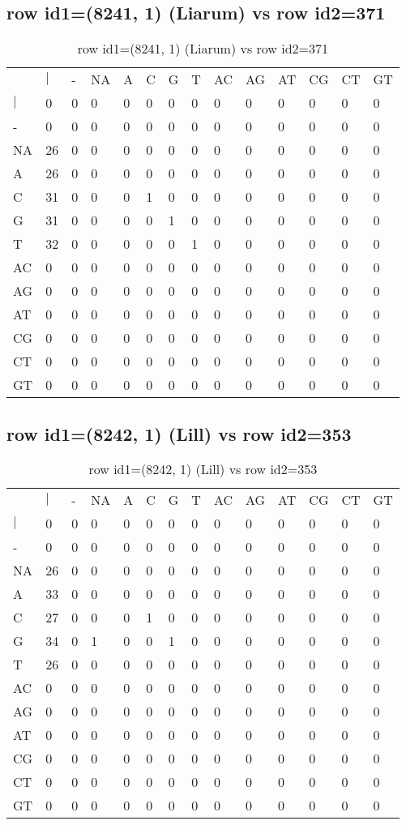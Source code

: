 \subsection{row id1=(8241, 1) (Liarum) vs row id2=371}
\begin{center}
\begin{longtable}{|l|l|l|l|l|l|l|l|l|l|l|l|l|l|}
\caption{row id1=(8241, 1) (Liarum) vs row id2=371} \label{table_dm178}\\
\hline
\\
\hline
&$|$&-&NA&A&C&G&T&AC&AG&AT&CG&CT&GT\\
$|$&0&0&0&0&0&0&0&0&0&0&0&0&0\\
-&0&0&0&0&0&0&0&0&0&0&0&0&0\\
NA&26&0&0&0&0&0&0&0&0&0&0&0&0\\
A&26&0&0&0&0&0&0&0&0&0&0&0&0\\
C&31&0&0&0&1&0&0&0&0&0&0&0&0\\
G&31&0&0&0&0&1&0&0&0&0&0&0&0\\
T&32&0&0&0&0&0&1&0&0&0&0&0&0\\
AC&0&0&0&0&0&0&0&0&0&0&0&0&0\\
AG&0&0&0&0&0&0&0&0&0&0&0&0&0\\
AT&0&0&0&0&0&0&0&0&0&0&0&0&0\\
CG&0&0&0&0&0&0&0&0&0&0&0&0&0\\
CT&0&0&0&0&0&0&0&0&0&0&0&0&0\\
GT&0&0&0&0&0&0&0&0&0&0&0&0&0\\
\hline
\end{longtable}
\end{center}

\subsection{row id1=(8242, 1) (Lill) vs row id2=353}
\begin{center}
\begin{longtable}{|l|l|l|l|l|l|l|l|l|l|l|l|l|l|}
\caption{row id1=(8242, 1) (Lill) vs row id2=353} \label{table_dm180}\\
\hline
\\
\hline
&$|$&-&NA&A&C&G&T&AC&AG&AT&CG&CT&GT\\
$|$&0&0&0&0&0&0&0&0&0&0&0&0&0\\
-&0&0&0&0&0&0&0&0&0&0&0&0&0\\
NA&26&0&0&0&0&0&0&0&0&0&0&0&0\\
A&33&0&0&0&0&0&0&0&0&0&0&0&0\\
C&27&0&0&0&1&0&0&0&0&0&0&0&0\\
G&34&0&1&0&0&1&0&0&0&0&0&0&0\\
T&26&0&0&0&0&0&0&0&0&0&0&0&0\\
AC&0&0&0&0&0&0&0&0&0&0&0&0&0\\
AG&0&0&0&0&0&0&0&0&0&0&0&0&0\\
AT&0&0&0&0&0&0&0&0&0&0&0&0&0\\
CG&0&0&0&0&0&0&0&0&0&0&0&0&0\\
CT&0&0&0&0&0&0&0&0&0&0&0&0&0\\
GT&0&0&0&0&0&0&0&0&0&0&0&0&0\\
\hline
\end{longtable}
\end{center}

